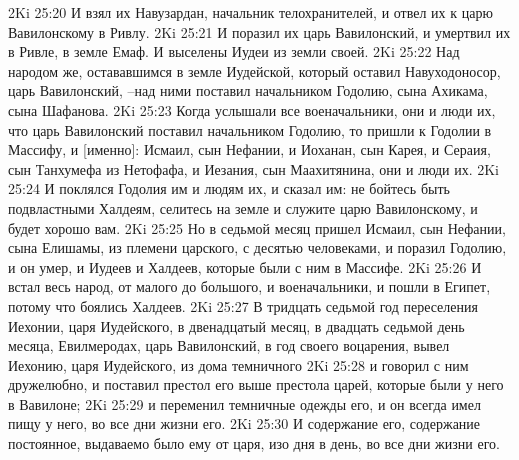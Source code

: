 2Ki 25:20  И взял их Навузардан, начальник телохранителей, и отвел их к царю Вавилонскому в Ривлу.
2Ki 25:21  И поразил их царь Вавилонский, и умертвил их в Ривле, в земле Емаф. И выселены Иудеи из земли своей.
2Ki 25:22  Над народом же, остававшимся в земле Иудейской, который оставил Навуходоносор, царь Вавилонский, --над ними поставил начальником Годолию, сына Ахикама, сына Шафанова.
2Ki 25:23  Когда услышали все военачальники, они и люди их, что царь Вавилонский поставил начальником Годолию, то пришли к Годолии в Массифу, и [именно]: Исмаил, сын Нефании, и Иоханан, сын Карея, и Сераия, сын Танхумефа из Нетофафа, и Иезания, сын Маахитянина, они и люди их.
2Ki 25:24  И поклялся Годолия им и людям их, и сказал им: не бойтесь быть подвластными Халдеям, селитесь на земле и служите царю Вавилонскому, и будет хорошо вам.
2Ki 25:25  Но в седьмой месяц пришел Исмаил, сын Нефании, сына Елишамы, из племени царского, с десятью человеками, и поразил Годолию, и он умер, и Иудеев и Халдеев, которые были с ним в Массифе.
2Ki 25:26  И встал весь народ, от малого до большого, и военачальники, и пошли в Египет, потому что боялись Халдеев.
2Ki 25:27  В тридцать седьмой год переселения Иехонии, царя Иудейского, в двенадцатый месяц, в двадцать седьмой день месяца, Евилмеродах, царь Вавилонский, в год своего воцарения, вывел Иехонию, царя Иудейского, из дома темничного
2Ki 25:28  и говорил с ним дружелюбно, и поставил престол его выше престола царей, которые были у него в Вавилоне;
2Ki 25:29  и переменил темничные одежды его, и он всегда имел пищу у него, во все дни жизни его.
2Ki 25:30  И содержание его, содержание постоянное, выдаваемо было ему от царя, изо дня в день, во все дни жизни его.


